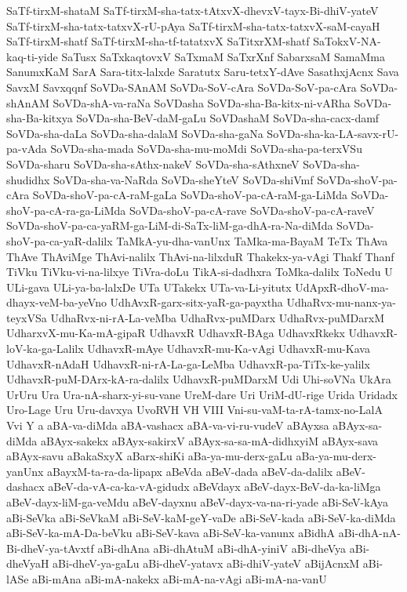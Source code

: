 {SaTf-tirxM-shataM
SaTf-tirxM-sha-tatx-tAtxvX-dhevxV-tayx-Bi-dhiV-yateV
SaTf-tirxM-sha-tatx-tatxvX-rU-pAya
SaTf-tirxM-sha-tatx-tatxvX-saM-cayaH
SaTf-tirxM-shatf
SaTf-tirxM-sha-tf-tatatxvX
SaTitxrXM-shatf
SaTokxV-NA-kaq-ti-yide
SaTusx
SaTxkaqtovxV
SaTxmaM
SaTxrXnf
SabarxsaM
SamaMma
SanumxKaM
SarA
Sara-titx-lalxde
Saratutx
Saru-tetxY-dAve
SasathxjAcnx
Sava
SavxM
Savxqqnf
SoVDa-SAnAM
SoVDa-SoV-cAra
SoVDa-SoV-pa-cAra
SoVDa-shAnAM
SoVDa-shA-va-raNa
SoVDasha
SoVDa-sha-Ba-kitx-ni-vARha
SoVDa-sha-Ba-kitxya
SoVDa-sha-BeV-daM-gaLu
SoVDashaM
SoVDa-sha-cacx-damf
SoVDa-sha-daLa
SoVDa-sha-dalaM
SoVDa-sha-gaNa
SoVDa-sha-ka-LA-savx-rU-pa-vAda
SoVDa-sha-mada
SoVDa-sha-mu-moMdi
SoVDa-sha-pa-terxVSu
SoVDa-sharu
SoVDa-sha-sAthx-nakeV
SoVDa-sha-sAthxneV
SoVDa-sha-shudidhx
SoVDa-sha-va-NaRda
SoVDa-sheYteV
SoVDa-shiVmf
SoVDa-shoV-pa-cAra
SoVDa-shoV-pa-cA-raM-gaLa
SoVDa-shoV-pa-cA-raM-ga-LiMda
SoVDa-shoV-pa-cA-ra-ga-LiMda
SoVDa-shoV-pa-cA-rave
SoVDa-shoV-pa-cA-raveV
SoVDa-shoV-pa-ca-yaRM-ga-LiM-di-SaTx-liM-ga-dhA-ra-Na-diMda
SoVDa-shoV-pa-ca-yaR-dalilx
TaMkA-yu-dha-vanUnx
TaMka-ma-BayaM
TeTx
ThAva
ThAve
ThAviMge
ThAvi-nalilx
ThAvi-na-lilxduR
Thakekx-ya-vAgi
Thakf
Thanf
TiVku
TiVku-vi-na-lilxye
TiVra-doLu
TikA-si-dadhxra
ToMka-dalilx
ToNedu
U
ULi-gava
ULi-ya-ba-lalxDe
UTa
UTakekx
UTa-va-Li-yitutx
UdApxR-dhoV-ma-dhayx-veM-ba-yeVno
UdhAvxR-garx-sitx-yaR-ga-payxtha
UdhaRvx-mu-nanx-ya-teyxVSa
UdhaRvx-ni-rA-La-veMba
UdhaRvx-puMDarx
UdhaRvx-puMDarxM
UdharxvX-mu-Ka-mA-gipaR
UdhavxR
UdhavxR-BAga
UdhavxRkekx
UdhavxR-loV-ka-ga-Lalilx
UdhavxR-mAye
UdhavxR-mu-Ka-vAgi
UdhavxR-mu-Kava
UdhavxR-nAdaH
UdhavxR-ni-rA-La-ga-LeMba
UdhavxR-pa-TiTx-ke-yalilx
UdhavxR-puM-DArx-kA-ra-dalilx
UdhavxR-puMDarxM
Udi
Uhi-soVNa
UkAra
UrUru
Ura
Ura-nA-sharx-yi-su-vane
UreM-dare
Uri
UriM-dU-rige
Urida
Uridadx
Uro-Lage
Uru
Uru-davxya
UvoRVH
VH
VIII
Vni-su-vaM-ta-rA-tamx-no-LalA
Vvi
Y
a
aBA-va-diMda
aBA-vashacx
aBA-va-vi-ru-vudeV
aBAyxsa
aBAyx-sa-diMda
aBAyx-sakekx
aBAyx-sakirxV
aBAyx-sa-sa-mA-didhxyiM
aBAyx-sava
aBAyx-savu
aBakaSxyX
aBarx-shiKi
aBa-ya-mu-derx-gaLu
aBa-ya-mu-derx-yanUnx
aBayxM-ta-ra-da-lipapx
aBeVda
aBeV-dada
aBeV-da-dalilx
aBeV-dashacx
aBeV-da-vA-ca-ka-vA-gidudx
aBeVdayx
aBeV-dayx-BeV-da-ka-liMga
aBeV-dayx-liM-ga-veMdu
aBeV-dayxnu
aBeV-dayx-va-na-ri-yade
aBi-SeV-kAya
aBi-SeVka
aBi-SeVkaM
aBi-SeV-kaM-geY-vaDe
aBi-SeV-kada
aBi-SeV-ka-diMda
aBi-SeV-ka-mA-Da-beVku
aBi-SeV-kava
aBi-SeV-ka-vanunx
aBidhA
aBi-dhA-nA-Bi-dheV-ya-tAvxtf
aBi-dhAna
aBi-dhAtuM
aBi-dhA-yiniV
aBi-dheVya
aBi-dheVyaH
aBi-dheV-ya-gaLu
aBi-dheV-yatavx
aBi-dhiV-yateV
aBijAcnxM
aBi-lASe
aBi-mAna
aBi-mA-nakekx
aBi-mA-na-vAgi
aBi-mA-na-vanU
}
